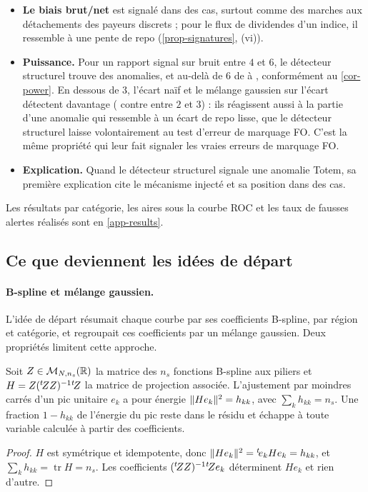 \begin{itemize}
titres difficiles à emprunter : les vues de repo des contributeurs y diffèrent d'environ $60$\,pb, si bien qu'un écart
FO de $15$ à $50$\,pb reste dans l'incertitude du consensus lui-même.
\item \textbf{Le biais brut/net} est signalé dans \vGrossStruct{} des cas, surtout comme des marches aux détachements
des payeurs discrets ; pour le flux de dividendes d'un indice, il ressemble à une pente de repo
(\cref{prop-signatures}, (vi)).
\item \textbf{Puissance.} Pour un rapport signal sur bruit entre $4$ et $6$, le détecteur structurel trouve
\vPowStructE{} des anomalies, et au-delà de $6$ de \vPowStructF{} à \vPowStructH, conformément au \cref{cor-power}. En
dessous de $3$, l'écart naïf et le mélange gaussien sur l'écart détectent davantage (\vPowGmmDiffC{} contre
\vPowStructC{} entre $2$ et $3$) : ils réagissent aussi à la partie d'une anomalie qui ressemble à un écart de repo
lisse, que le détecteur structurel laisse volontairement au test d'erreur de marquage FO. C'est la même propriété qui
leur fait signaler les vraies erreurs de marquage FO.
\item \textbf{Explication.} Quand le détecteur structurel signale une anomalie Totem, sa première explication cite le
mécanisme injecté et sa position dans \vAttr{} des cas.
\end{itemize}
Les résultats par catégorie, les aires sous la courbe ROC et les taux de fausses alertes réalisés sont en
\cref{app-results}.

\subsection{Ce que deviennent les idées de départ}
\paragraph{B-spline et mélange gaussien.} L'idée de départ résumait chaque courbe par ses coefficients B-spline, par
région et catégorie, et regroupait ces coefficients par un mélange gaussien. Deux propriétés limitent cette approche.

\begin{proposition}\label{prop-leverage}
Soit $Z\in\mathcal{M}_{N,n_s}(\mathbb{R})$ la matrice des $n_s$ fonctions B-spline aux piliers et $H=Z({}^{t}\!ZZ)^{-1}{}^{t}\!Z$ la
matrice de projection associée. L'ajustement par moindres carrés d'un pic unitaire $e_k$ a pour énergie
$\lVert He_k\rVert^2=h_{kk}$, avec $\sum_kh_{kk}=n_s$. Une fraction $1-h_{kk}$ de l'énergie du pic reste dans le résidu et échappe à toute variable
calculée à partir des coefficients.
\end{proposition}
\begin{proof}
$H$ est symétrique et idempotente, donc $\lVert He_k\rVert^2={}^{t}\!e_kHe_k=h_{kk}$, et $\sum_kh_{kk}=\operatorname{tr}H=n_s$.
Les coefficients $({}^{t}\!ZZ)^{-1}{}^{t}\!Ze_k$ déterminent $He_k$ et rien d'autre.
\end{proof}

